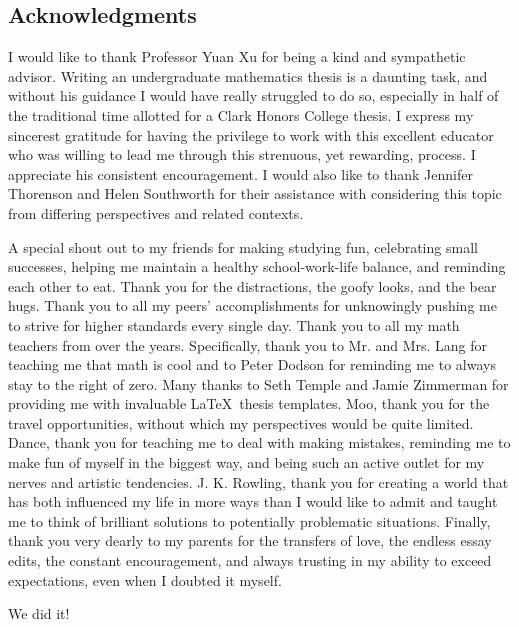 \documentclass[letterpaper, 12pt]{article}
\begin{document}


\newpage
\begin{centering}\section*{Acknowledgments}\end{centering}

I would like to thank Professor Yuan Xu for being a kind and sympathetic advisor. Writing an undergraduate mathematics thesis is a daunting task, and without his guidance I would have really struggled to do so, especially in half of the traditional time allotted for a Clark Honors College thesis. I express my sincerest gratitude for having the privilege to work with this excellent educator who was willing to lead me through this strenuous, yet rewarding, process. I appreciate his consistent encouragement. I would also like to thank Jennifer Thorenson and Helen Southworth for their assistance with considering this topic from differing perspectives and related contexts. 

A special shout out to my friends for making studying fun, celebrating small successes, helping me maintain a healthy school-work-life balance, and reminding each other to eat. Thank you for the distractions, the goofy looks, and the bear hugs. Thank you to all my peers' accomplishments for unknowingly pushing me to strive for higher standards every single day. Thank you to all my math teachers from over the years. Specifically, thank you to Mr. and Mrs. Lang for teaching me that math is cool and to Peter Dodson for reminding me to always stay to the right of zero. Many thanks to Seth Temple and Jamie Zimmerman for providing me with invaluable \LaTeX\ thesis templates. Moo, thank you for the travel opportunities, without which my perspectives would be quite limited. Dance, thank you for teaching me to deal with making mistakes, reminding me to make fun of myself in the biggest way, and being such an active outlet for my nerves and artistic tendencies. J. K. Rowling, thank you for creating a world that has both influenced my life in more ways than I would like to admit and taught me to think of brilliant solutions to potentially problematic situations. Finally, thank you very dearly to my parents for the transfers of love, the endless essay edits, the constant encouragement, and always trusting in my ability to exceed expectations, even when I doubted it myself.

We did it!
\end{document}
